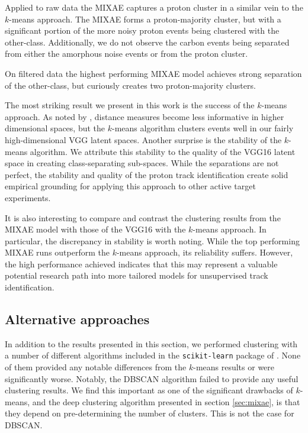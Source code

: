 \documentclass[preprint,12pt]{elsarticle}
\begin{document}
Applied to raw data the MIXAE captures a proton cluster in a similar vein to the $k$-means approach. The MIXAE forms a proton-majority cluster, but with a significant portion of the more noisy proton events being clustered with the other-class. Additionally, we do not observe the carbon events being separated from either the amorphous noise events or from the proton cluster. 

On filtered data the highest performing MIXAE model achieves strong separation of the other-class, but curiously creates two proton-majority clusters.
 


The most striking result we present in this work is the success of the $k$-means approach. As noted by \cite{Aggarwal}, distance measures become less informative in higher dimensional spaces, but the $k$-means algorithm clusters events well in our fairly high-dimensional VGG latent spaces.
Another surprise is the stability of the $k$-means algorithm. We attribute this stability to the quality of the VGG16 latent space in creating class-separating sub-spaces. While the separations are not perfect, the stability and quality of the proton track identification create solid empirical grounding for applying this approach to other active target experiments. 


It is also interesting to compare and contrast the clustering results from the MIXAE model with those of the VGG16 with the  $k$-means approach. In particular, the discrepancy in stability is worth noting. While the top performing MIXAE runs outperform the $k$-means approach, its reliability suffers. However, the high performance achieved indicates that this may represent a valuable potential research path into more tailored models for unsupervised track identification.


\subsection{Alternative approaches}

In addition to the results presented in this section, we performed clustering with a number of different algorithms included in the \texttt{scikit-learn} package of \citet{Pedregosa2011}. None of them provided any notable differences from the $k$-means results or were significantly worse. Notably, the DBSCAN algorithm \cite{Ester96adensity-based,Bergstra2012} failed to provide any useful clustering results. We find this important as one of the significant drawbacks of $k$-means, and the deep clustering algorithm presented in section \ref{sec:mixae}, is that they depend  on pre-determining the number of clusters. This is not the case for DBSCAN. 
\end{document}
